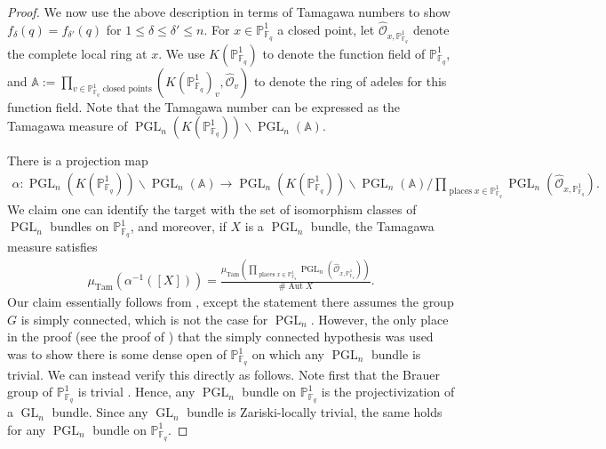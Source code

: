 \documentclass[12 pt]{amsart}
\theoremstyle{plain}
\theoremstyle{definition}
\theoremstyle{remark}
\numberwithin{equation}{section}
\newcommand\bp{\mathbb P}
\newcommand\sco{\mathscr O}
\DeclareMathOperator\pgl{PGL}
\DeclareMathOperator\aut{Aut}
\DeclareMathOperator\gl{GL}
\newcommand{\on}[1]{\operatorname{#1}}
\begin{document}
\begin{proof}
	We now use the above description in terms of Tamagawa numbers to show
	$f_\delta(q) = f_{\delta'}(q)$ for $1 \leq \delta \leq \delta' \leq n$.
	For $x \in \bp^1_{\mathbb F_q}$ a closed point, let
	$\widehat{\sco}_{x,\mathbb P^1_{\mathbb F_q}}$
	denote the complete local ring at $x$.
	We use $K(\mathbb P^1_{\mathbb F_q})$ to denote the function field of
	$\mathbb P^1_{\mathbb F_q}$, and $\mathbb A := \prod_{v \in \mathbb P^1_{\mathbb
F_q} \text{ closed points}} \left( K(\mathbb P^1_{\mathbb F_q})_v,
\widehat{\mathscr O}_v
\right)$ to denote the ring of adeles for
this function field.
	Note that the Tamagawa number can be expressed as the Tamagawa measure
	of $\pgl_n(K(\mathbb P^1_{\mathbb F_q})) \backslash \pgl_n(\mathbb A)$.
 
	There is a projection map 
	\begin{align}
		\label{equation:tamagawa-quotient}
	\alpha: \pgl_n(K(\mathbb P^1_{\mathbb F_q})) \backslash \pgl_n(\mathbb A) 
	\to \pgl_n(K(\mathbb P^1_{\mathbb F_q})) \backslash
	\pgl_n(\mathbb A) / \prod_{\on{places } x \in \mathbb
	P^1_{\mathbb F_q}} \pgl_n(\widehat{\sco}_{x,\mathbb
	P^1_{\mathbb F_q}}).
	\end{align}
	We claim one can identify the target with the set of isomorphism classes
	of $\pgl_n$ bundles on $\mathbb P^1_{\mathbb F_q}$, and moreover, if
	$X$ is a $\pgl_n$ bundle, the
	Tamagawa measure satisfies 
	\begin{align}
		\label{equation:bundle-tamagawa-measure}
	\mu_{\on{Tam}}(\alpha^{-1}([X])) =
	\frac{\mu_{\on{Tam}}\left(\prod_{\on{places } x \in \mathbb P^1_{\mathbb
		F_q}} \pgl_n(\widehat{\sco}_{x,\mathbb P^1_{\mathbb
F_q}})\right)}{ \# \aut X}.
	\end{align}
		Our claim essentially follows from \cite[Proposition
	1.3.2.11]{gaitsgoryL:weils-conjecture}, except the statement there
	assumes the group $G$ is simply connected, which is not the case for
	$\pgl_n$. However, the only place in the proof 
	(see the proof of \cite[Proposition
	1.3.2.10]{gaitsgoryL:weils-conjecture})
	that the simply
	connected hypothesis was used was to show there is some dense open of
	$\mathbb P^1_{\mathbb F_q}$ on
	which any $\pgl_n$ bundle is trivial.
	We can instead verify this directly as follows. Note first that 
	the Brauer group of $\mathbb P^1_{\mathbb F_q}$ is trivial
	\cite[Remarques 2.5(b)]{grothendieck:brauer-iii}.
	Hence, any $\pgl_n$ bundle
	on $\mathbb P^1_{\mathbb F_q}$ is the projectivization of a $\gl_n$
	bundle.
	Since any $\gl_n$ bundle is Zariski-locally trivial, the same holds for
	any $\pgl_n$ bundle on $\mathbb P^1_{\mathbb F_q}$.


\end{proof}
\end{document}

